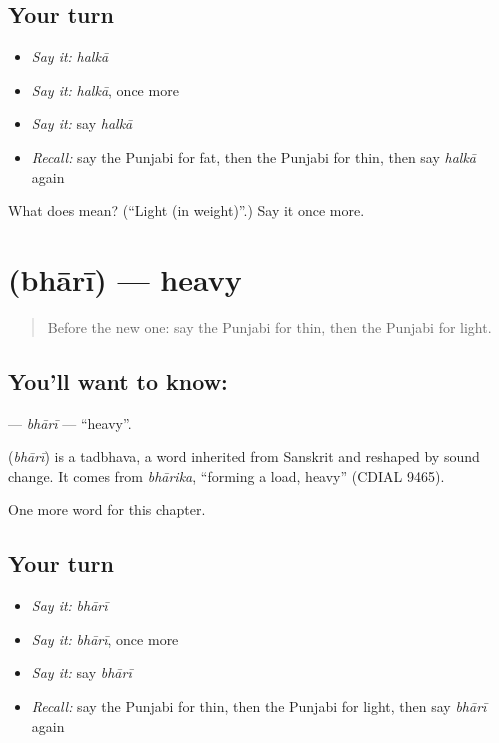 \subsection*{Your turn}
\begin{itemize}
\raggedright
  \item \emph{Say it:} \emph{halkā}
  \item \emph{Say it:} \emph{halkā}, once more
  \item \emph{Say it:} say \emph{halkā}
  \item \emph{Recall:} say the Punjabi for fat, then the Punjabi for thin, then say \emph{halkā} again
\end{itemize}

\begin{tcolorbox}[breakable,colback=teal!4,colframe=teal!35!black,title={Before you move on}]
What does  mean? (\textquotedblleft{}Light (in weight)\textquotedblright{}.) Say it once more.
\end{tcolorbox}
\section[\texorpdfstring{\pa{ਭਾਰੀ} (bhārī)}{ਭਾਰੀ (bhārī)}]{ (bhārī) — heavy}

\label{lesson:PA-C83-bhari}



\begin{quote}
Before the new one: say the Punjabi for thin, then the Punjabi for light.
\end{quote}

\subsection*{You'll want to know: }
\textbf{} — \emph{bhārī} — \textquotedblleft{}heavy\textquotedblright{}.

\begin{cousinweb}
\textbf{} (\emph{bhārī}) is a tadbhava, a word inherited from Sanskrit and reshaped by sound change. It comes from \emph{bhārika}, \textquotedblleft{}forming a load, heavy\textquotedblright{} (CDIAL 9465).
\end{cousinweb}

\begin{grammarlens}[title={What you've built}]
One more word for this chapter.
\end{grammarlens}

\subsection*{Your turn}
\begin{itemize}
\raggedright
  \item \emph{Say it:} \emph{bhārī}
  \item \emph{Say it:} \emph{bhārī}, once more
  \item \emph{Say it:} say \emph{bhārī}
  \item \emph{Recall:} say the Punjabi for thin, then the Punjabi for light, then say \emph{bhārī} again
\end{itemize}

